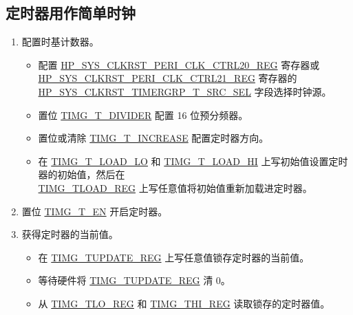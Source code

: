 \documentclass[main\_\_CN.tex]{subfiles}
\begin{document}
\subsection{定时器用作简单时钟}\label{sec:timg-func-descr-simple-clock}
\begin{enumerate}
    \item 配置时基计数器。
        \begin{itemize}
        \item 配置 \hyperref[regdesc:HPSYSCLKRSTPERICLKCTRL20REG]{HP\_SYS\_CLKRST\_PERI\_CLK\_CTRL20\_REG} 寄存器或 \hyperref[regdesc:HPSYSCLKRSTPERICLKCTRL21REG]{HP\_SYS\_CLKRST\_PERI\_CLK\_CTRL21\_REG} 寄存器的 \hyperref[fielddesc:HPSYSCLKRSTTIMERGRP0T0SRCSEL]{HP\_SYS\_CLKRST\_TIMERGRP\_T\_SRC\_SEL} 字段选择时钟源。
        \item 置位 \hyperref[fielddesc:TIMGTXDIVIDER]{TIMG\_T\_DIVIDER} 配置 16 位预分频器。
        \item 置位或清除 \hyperref[fielddesc:TIMGTXINCREASE]{TIMG\_T\_INCREASE} 配置定时器方向。
        \item 在 \hyperref[fielddesc:TIMGTXLOADLO]{TIMG\_T\_LOAD\_LO} 和 \hyperref[fielddesc:TIMGTXLOADHI]{TIMG\_T\_LOAD\_HI} 上写初始值设置定时器的初始值，然后在 \\\hyperref[regdesc:TIMGTXLOADREG]{TIMG\_TLOAD\_REG} 上写任意值将初始值重新加载进定时器。
    \end{itemize}
    \item 置位 \hyperref[fielddesc:TIMGTXEN]{TIMG\_T\_EN} 开启定时器。
    \item 获得定时器的当前值。
    \begin{itemize}
        \item 在 \hyperref[regdesc:TIMGTXUPDATEREG]{TIMG\_TUPDATE\_REG} 上写任意值锁存定时器的当前值。
        \item 等待硬件将 \hyperref[regdesc:TIMGTXUPDATEREG]{TIMG\_TUPDATE\_REG} 清 0。
        \item 从 \hyperref[regdesc:TIMGTXLOREG]{TIMG\_TLO\_REG} 和 \hyperref[regdesc:TIMGTXHIREG]{TIMG\_THI\_REG} 读取锁存的定时器值。
    \end{itemize}
\end{enumerate}
\end{document}

